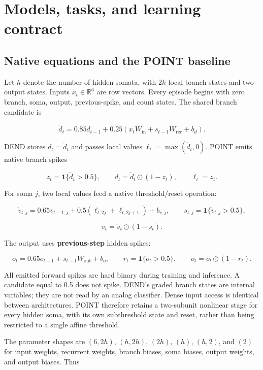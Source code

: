 \documentclass[
  10pt,
]{article}
\begin{document}
\section{Models, tasks, and learning
contract}\label{models-tasks-and-learning-contract}

\subsection{Native equations and the POINT
baseline}\label{native-equations-and-the-point-baseline}

Let \(h\) denote the number of hidden somata, with \(2h\) local branch
states and two output states. Inputs \(x_t\in\mathbb{R}^{6}\) are row
vectors. Every episode begins with zero branch, soma, output,
previous-spike, and count states. The shared branch candidate is

\[
\widetilde d_t=0.85d_{t-1}+0.25\left(x_tW_{\mathrm{in}}+s_{t-1}W_{\mathrm{rec}}+b_d\right).
\]

DEND stores \(d_t=\widetilde d_t\) and passes local values
\(\ell_t=\max(\widetilde d_t,0)\). POINT emits native branch spikes

\[
z_t=\mathbf 1\{\widetilde d_t>0.5\},\qquad
d_t=\widetilde d_t\odot(1-z_t),\qquad \ell_t=z_t.
\]

For soma \(j\), two local values feed a native threshold/reset
operation:

\[
\widetilde v_{t,j}=0.65v_{t-1,j}+0.5(\ell_{t,2j}+\ell_{t,2j+1})+b_{v,j},
\qquad s_{t,j}=\mathbf 1\{\widetilde v_{t,j}>0.5\},
\]

\[
v_t=\widetilde v_t\odot(1-s_t).
\]

The output uses \textbf{previous-step} hidden spikes:

\[
\widetilde o_t=0.65o_{t-1}+s_{t-1}W_{\mathrm{out}}+b_o,
\qquad r_t=\mathbf 1\{\widetilde o_t>0.5\},\qquad
o_t=\widetilde o_t\odot(1-r_t).
\]

All emitted forward spikes are hard binary during training and
inference. A candidate equal to 0.5 does not spike. DEND's graded branch
states are internal variables; they are not read by an analog
classifier. Dense input access is identical between architectures. POINT
therefore retains a two-subunit nonlinear stage for every hidden soma,
with its own subthreshold state and reset, rather than being restricted
to a single affine threshold.

The parameter shapes are \((6,2h)\), \((h,2h)\), \((2h)\), \((h)\),
\((h,2)\), and \((2)\) for input weights, recurrent weights, branch
biases, soma biases, output weights, and output biases. Thus
\end{document}
